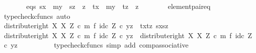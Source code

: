 \begin{isabellebody}
\ \ \ \ \isamarkupfalse%
\ \isamarkupfalse%
\ eqs{\isacharcolon}{\kern0pt}\ {\isachardoublequoteopen}sx\ {\isacharequal}{\kern0pt}\ my{}\ {\isasymand}\ sz\ {\isacharequal}{\kern0pt}\ z\ {\isasymand}\ tx\ {\isacharequal}{\kern0pt}\ my{}\ {\isasymand}\ tz\ {\isacharequal}{\kern0pt}\ z{\isachardoublequoteclose}\isanewline
\ \ \ \ \ \ \isamarkupfalse%
\ element{\isacharunderscore}{\kern0pt}pair{\isacharunderscore}{\kern0pt}eq\ \isamarkupfalse%
\ {\isacharparenleft}{\kern0pt}typecheck{\isacharunderscore}{\kern0pt}cfuncs{\isacharcomma}{\kern0pt}\ auto{\isacharparenright}{\kern0pt}\isanewline
\isanewline
\ \ \ \ \isamarkupfalse%
\ {\isachardoublequoteopen}{\isacharparenleft}{\kern0pt}distribute{\isacharunderscore}{\kern0pt}right\ X\ X\ Z\ {\isasymcirc}\isactrlsub c\ {\isacharparenleft}{\kern0pt}m\ {\isasymtimes}\isactrlsub f\ id\isactrlsub c\ Z{\isacharparenright}{\kern0pt}{\isacharparenright}{\kern0pt}\ {\isasymcirc}\isactrlsub c\ {\isasymlangle}y{\isacharprime}{\kern0pt}{\isacharcomma}{\kern0pt}z{\isasymrangle}\ {\isacharequal}{\kern0pt}\ {\isasymlangle}{\isasymlangle}tx{\isacharcomma}{\kern0pt}tz{\isasymrangle}{\isacharcomma}{\kern0pt}\ {\isasymlangle}sx{\isacharcomma}{\kern0pt}sz{\isasymrangle}{\isasymrangle}{\isachardoublequoteclose}\isanewline
\ \ \ \ \isamarkupfalse%
\ {\isacharminus}{\kern0pt}\isanewline
\ \ \ \ \ \ \isamarkupfalse%
\ {\isachardoublequoteopen}{\isacharparenleft}{\kern0pt}distribute{\isacharunderscore}{\kern0pt}right\ X\ X\ Z\ {\isasymcirc}\isactrlsub c\ {\isacharparenleft}{\kern0pt}m\ {\isasymtimes}\isactrlsub f\ id\isactrlsub c\ Z{\isacharparenright}{\kern0pt}{\isacharparenright}{\kern0pt}\ {\isasymcirc}\isactrlsub c\ {\isasymlangle}y{\isacharprime}{\kern0pt}{\isacharcomma}{\kern0pt}z{\isasymrangle}\ {\isacharequal}{\kern0pt}\ distribute{\isacharunderscore}{\kern0pt}right\ X\ X\ Z\ {\isasymcirc}\isactrlsub c\ {\isacharparenleft}{\kern0pt}m\ {\isasymtimes}\isactrlsub f\ id\isactrlsub c\ Z{\isacharparenright}{\kern0pt}\ {\isasymcirc}\isactrlsub c\ {\isasymlangle}y{\isacharprime}{\kern0pt}{\isacharcomma}{\kern0pt}z{\isasymrangle}{\isachardoublequoteclose}\isanewline
\ \ \ \ \ \ \ \ \isamarkupfalse%
\ {\isacharparenleft}{\kern0pt}typecheck{\isacharunderscore}{\kern0pt}cfuncs{\isacharcomma}{\kern0pt}\ simp\ add{\isacharcolon}{\kern0pt}\ comp{\isacharunderscore}{\kern0pt}associative{}{\isacharparenright}{\kern0pt}\isanewline
\ \ \ \ \ \ \isamarkupfalse%
\ \isamarkupfalse%

\end{isabellebody}
